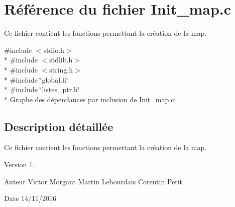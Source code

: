 \hypertarget{a00007}{}\section{Référence du fichier Init\+\_\+map.\+c}
\label{a00007}


Ce fichier contient les fonctions permettant la création de la map.  


{\ttfamily \#include $<$stdio.\+h$>$}\\*
{\ttfamily \#include $<$stdlib.\+h$>$}\\*
{\ttfamily \#include $<$string.\+h$>$}\\*
{\ttfamily \#include \char`\"{}global.\+h\char`\"{}}\\*
{\ttfamily \#include \char`\"{}listes\+\_\+ptr.\+h\char`\"{}}\\*
Graphe des dépendances par inclusion de Init\+\_\+map.\+c\+:


\subsection{Description détaillée}
Ce fichier contient les fonctions permettant la création de la map. 

\begin{DoxyVersion}{Version}
1. 
\end{DoxyVersion}
\begin{DoxyAuthor}{Auteur}
Victor Morgant Martin Lebourdais Corentin Petit 
\end{DoxyAuthor}
\begin{DoxyDate}{Date}
14/11/2016 
\end{DoxyDate}
